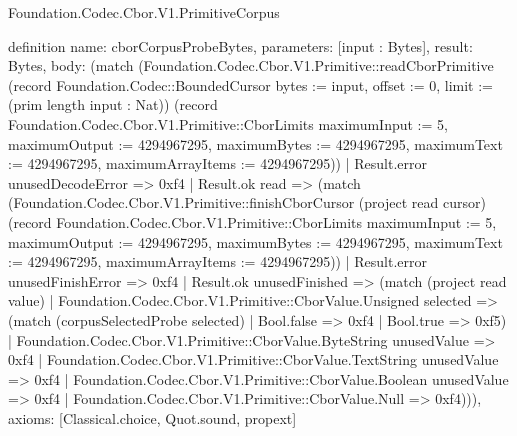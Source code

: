 \begin{lexlean}{Foundation.Codec.Cbor.V1.PrimitiveCorpus}
\begin{semanticmodule}
definition{
  name: cborCorpusProbeBytes,
  parameters: [input : Bytes],
  result: Bytes,
  body: (match (Foundation.Codec.Cbor.V1.Primitive::readCborPrimitive (record Foundation.Codec::BoundedCursor {bytes := input, offset := 0, limit := (prim length input : Nat)}) (record Foundation.Codec.Cbor.V1.Primitive::CborLimits {maximumInput := 5, maximumOutput := 4294967295, maximumBytes := 4294967295, maximumText := 4294967295, maximumArrayItems := 4294967295}))
    | Result.error unusedDecodeError => 0xf4
    | Result.ok read => (match (Foundation.Codec.Cbor.V1.Primitive::finishCborCursor (project read cursor) (record Foundation.Codec.Cbor.V1.Primitive::CborLimits {maximumInput := 5, maximumOutput := 4294967295, maximumBytes := 4294967295, maximumText := 4294967295, maximumArrayItems := 4294967295}))
      | Result.error unusedFinishError => 0xf4
      | Result.ok unusedFinished => (match (project read value)
        | Foundation.Codec.Cbor.V1.Primitive::CborValue.Unsigned selected => (match (corpusSelectedProbe selected)
          | Bool.false => 0xf4
          | Bool.true => 0xf5)
        | Foundation.Codec.Cbor.V1.Primitive::CborValue.ByteString unusedValue => 0xf4
        | Foundation.Codec.Cbor.V1.Primitive::CborValue.TextString unusedValue => 0xf4
        | Foundation.Codec.Cbor.V1.Primitive::CborValue.Boolean unusedValue => 0xf4
        | Foundation.Codec.Cbor.V1.Primitive::CborValue.Null => 0xf4))),
  axioms: [Classical.choice, Quot.sound, propext]
}
\end{semanticmodule}
\end{lexlean}
